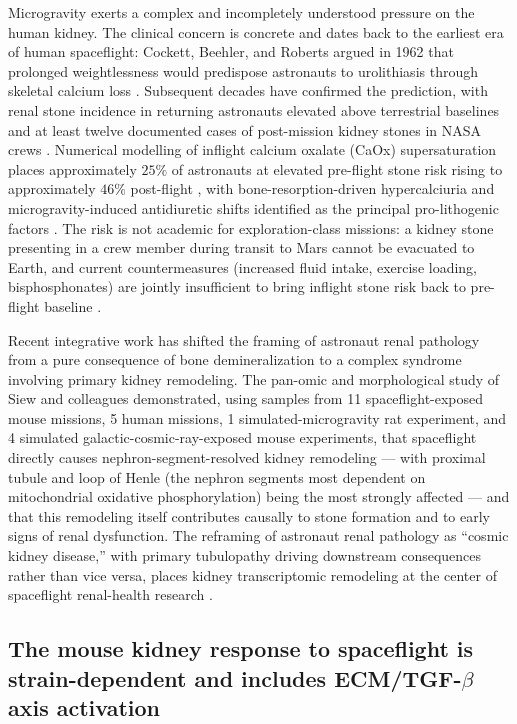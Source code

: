\documentclass[11pt]{article}
\begin{document}
Microgravity exerts a complex and incompletely understood pressure on the human kidney. The clinical concern is concrete and dates back to the earliest era of human spaceflight: Cockett, Beehler, and Roberts argued in 1962 that prolonged weightlessness would predispose astronauts to urolithiasis through skeletal calcium loss \citep{cockett1962astronautical}. Subsequent decades have confirmed the prediction, with renal stone incidence in returning astronauts elevated above terrestrial baselines and at least twelve documented cases of post-mission kidney stones in NASA crews \citep{pietrzyk2007renal, smith2014men}. Numerical modelling of inflight calcium oxalate (CaOx) supersaturation places approximately $25\%$ of astronauts at elevated pre-flight stone risk rising to approximately $46\%$ post-flight \citep{kassemi2021numerical}, with bone-resorption-driven hypercalciuria and microgravity-induced antidiuretic shifts identified as the principal pro-lithogenic factors \citep{smith2014men, siew2024cosmic}. The risk is not academic for exploration-class missions: a kidney stone presenting in a crew member during transit to Mars cannot be evacuated to Earth, and current countermeasures (increased fluid intake, exercise loading, bisphosphonates) are jointly insufficient to bring inflight stone risk back to pre-flight baseline \citep{nationalacademies2018renal}.

Recent integrative work has shifted the framing of astronaut renal pathology from a pure consequence of bone demineralization to a complex syndrome involving primary kidney remodeling. The pan-omic and morphological study of Siew and colleagues \citep{siew2024cosmic} demonstrated, using samples from 11 spaceflight-exposed mouse missions, 5 human missions, 1 simulated-microgravity rat experiment, and 4 simulated galactic-cosmic-ray-exposed mouse experiments, that spaceflight directly causes nephron-segment-resolved kidney remodeling --- with proximal tubule and loop of Henle (the nephron segments most dependent on mitochondrial oxidative phosphorylation) being the most strongly affected --- and that this remodeling itself contributes causally to stone formation and to early signs of renal dysfunction. The reframing of astronaut renal pathology as ``cosmic kidney disease,'' with primary tubulopathy driving downstream consequences rather than vice versa, places kidney transcriptomic remodeling at the center of spaceflight renal-health research \citep{siew2024cosmic, chouker2025impact}.

\subsection{The mouse kidney response to spaceflight is strain-dependent and includes ECM/TGF-$\beta$ axis activation}
\end{document}
